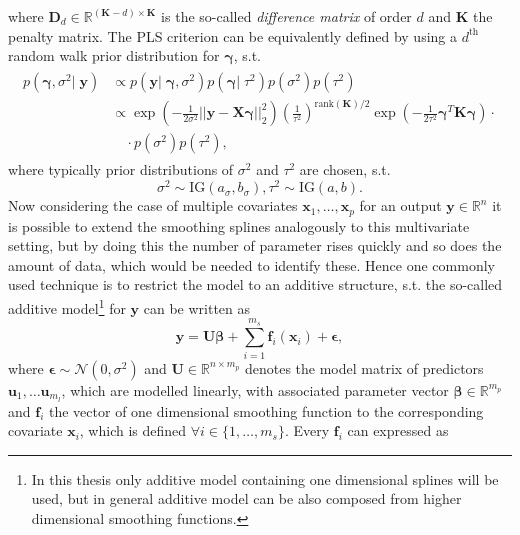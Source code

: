 \documentclass[12pt,letterpaper]{article}
\begin{document}
where $\mathbf{D}_d \in \mathbb{R}^{(\mathbf{K}-d) \times \mathbf{K}}$ is the so-called \textit{difference matrix} of order $d$ and $\mathbf{K}$ the penalty matrix. The PLS criterion can be equivalently defined by using a $d^{\text{th}}$ random walk prior distribution for $\mathbf{\gamma}$, s.t. 
\begin{align}
\begin{split}
p(\mathbf{\gamma}, \sigma^2 | \; \mathbf{y}) & \propto  p(\mathbf{y} | \; \mathbf{\gamma}, \sigma^2) p(\mathbf{\gamma} | \; \tau^2) p(\sigma^2) p(\tau^2) \\
& \propto  \exp(-\frac{1}{2\sigma^2}||\mathbf{y} - \mathbf{X}\mathbf{\gamma}||^2_2)
(\frac{1}{\tau^2})^{\text{rank}(\mathbf{K})/2}\exp(-\frac{1}{2\tau^2}\mathbf{\gamma}^T\mathbf{K}\mathbf{\gamma}) \cdot \\
 &  \quad\cdot p(\sigma^2) p(\tau^2),
\end{split}
\end{align}
where typically prior distributions of $\sigma^2$ and $\tau^2$ are chosen, s.t. 
\begin{equation}
\sigma^2 \sim \text{IG}(a_\sigma, b_\sigma), \tau^2 \sim \text{IG}(a, b).
\end{equation}
Now considering the case of multiple covariates $\mathbf{x}_1, \dots , \mathbf{x}_p$ for an output $\mathbf{y} \in \mathbb{R}^n$ it is possible to extend the smoothing splines analogously to this multivariate setting, but by doing this the number of parameter rises quickly and so does the amount of data, which would be needed to identify these. Hence one commonly used technique is to restrict the model to an additive structure, s.t. the so-called additive model\footnote{In this thesis only additive model containing one dimensional splines will be used, but in general additive model can be also composed from higher dimensional smoothing functions.} for $\mathbf{y}$ can be written as
\begin{equation}
\mathbf{y} = \mathbf{U}\mathbf{\beta} +  \sum^{m_s}_{i=1} \mathbf{f}_i(\mathbf{x}_i) + \mathbf{\epsilon},
\label{eq:am}
\end{equation}
where $\mathbf{\epsilon} \sim \mathcal{N}(0, \sigma^2)$ and $\mathbf{U}\in \mathbb{R}^{n\times m_{p}} $ denotes the model matrix of predictors $\mathbf{u}_1,\dots\mathbf{u}_{m_l}$, which are modelled linearly, with associated parameter vector $\mathbf{\beta} \in \mathbb{R}^{ m_{p}}$ and $\mathbf{f}_i$ the vector of one dimensional smoothing function to the corresponding covariate $\mathbf{x}_i$, which is defined $\forall i \in \{1,\dots ,m_{s}\}$. Every $\mathbf{f}_i$ can expressed as 
\end{document}
